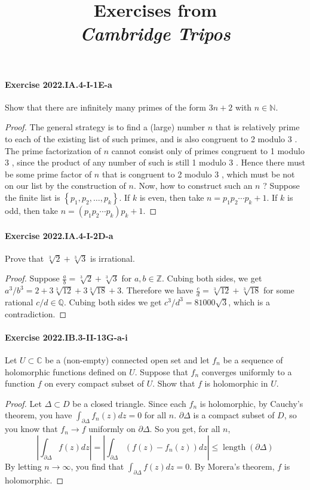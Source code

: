 \documentclass{article}
\title{\textbf{
Exercises from \\
\textit{Cambridge Tripos}
}}
\date{}
\begin{document}
\maketitle


\paragraph{Exercise 2022.IA.4-I-1E-a} Show that there are infinitely many primes of the form $3 n+2$ with $n \in \mathbb{N}$.
\begin{proof}
    The general strategy is to find a (large) number $n$ that is relatively prime to each of the existing list of such primes, and is also congruent to 2 modulo 3 . The prime factorization of $n$ cannot consist only of primes congruent to 1 modulo 3 , since the product of any number of such is still 1 modulo 3 . Hence there must be some prime factor of $n$ that is congruent to 2 modulo 3 , which must be not on our list by the construction of $n$.
Now, how to construct such an $n$ ? Suppose the finite list is $\left\{p_1, p_2, \ldots, p_k\right\}$. If $k$ is even, then take $n=p_1 p_2 \cdots p_k+1$. If $k$ is odd, then take $n=\left(p_1 p_2 \cdots p_k\right) p_k+1$.
\end{proof}


\paragraph{Exercise 2022.IA.4-I-2D-a} Prove that $\sqrt[3]{2}+\sqrt[3]{3}$ is irrational.
\begin{proof}
    Suppose $\frac{a}{b} = \sqrt[3]{2}+\sqrt[3]{3}$ for $a,b\in\mathbb{Z}$. Cubing both sides, we get $a^3/b^3 = 2 + 3 \sqrt[3]{12} + 3\sqrt[3]{18}+3$. Therefore we have $\frac{c}{d} = \sqrt[3]{12} + \sqrt[3]{18}$ for some rational $c/d\in\mathbb{Q}$. Cubing both sides we get $c^3/d^3 = 81000\sqrt{3}$, which is a contradiction.
\end{proof}


\paragraph{Exercise 2022.IB.3-II-13G-a-i} Let $U \subset \mathbb{C}$ be a (non-empty) connected open set and let $f_n$ be a sequence of holomorphic functions defined on $U$. Suppose that $f_n$ converges uniformly to a function $f$ on every compact subset of $U$. Show that $f$ is holomorphic in $U$.
\begin{proof}
    Let $\Delta \subset D$ be a closed triangle. Since each $f_n$ is holomorphic, by Cauchy's theorem, you have $\int_{\partial \Delta} f_n(z) d z=0$ for all $n$.
$\partial \Delta$ is a compact subset of $D$, so you know that $f_n \rightarrow f$ uniformly on $\partial \Delta$.
So you get, for all $n$,
$$
\left|\int_{\partial \Delta} f(z) d z\right|=\left|\int_{\partial \Delta}\left(f(z)-f_n(z)\right) d z\right| \leq \operatorname{length}(\partial \Delta)
$$
By letting $n \rightarrow \infty$, you find that $\int_{\partial \Delta} f(z) d z=0$.
By Morera's theorem, $f$ is holomorphic.
\end{proof}
\end{document}
